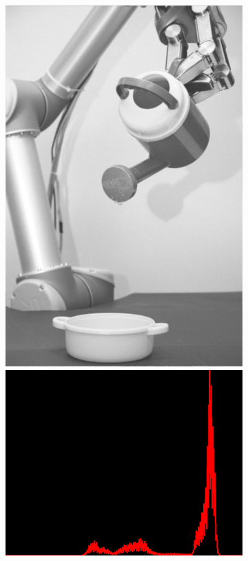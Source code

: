 \begin{figure}[H]
    \centering
    \begin{subfigure}[b]{0.28\textwidth}
        \includegraphics[width=\textwidth]{img3/midpoint_5_final_img3.png}\\[0.1cm]
        \includegraphics[width=\textwidth]{img3/hist_rect_5_midpoint_5_final_img3_org.png}

\end{subfigure}
\end{figure}
